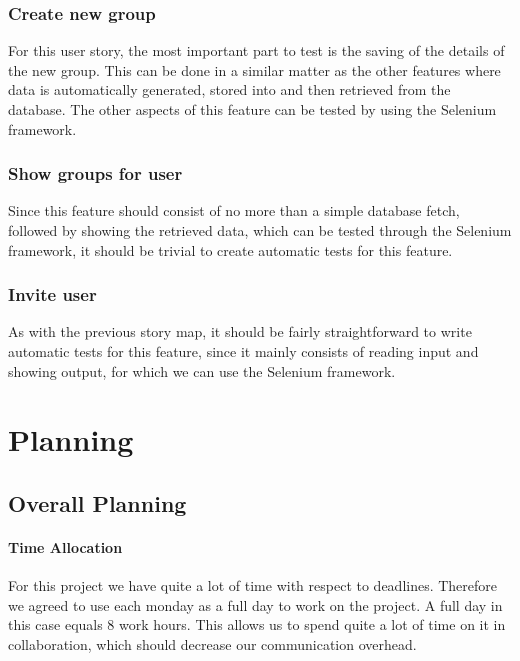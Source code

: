 \documentclass[10pt,a4paper,BCOR12mm, headexclude, footexclude,
  twoside, openright]{scrartcl}
\numberwithin{equation}{section} %
\numberwithin{figure}{section} %
\numberwithin{table}{section} %
\begin{document}
\subsubsection*{Create new group}
For this user story, the most important part to test is the saving of the details
of the new group. This can be done in a similar matter as the other features
where data is automatically generated, stored into and then retrieved from the
database.  The other aspects of this feature can be tested by using the Selenium
framework.

\subsubsection*{Show groups for user}
Since this feature should consist of no more than a simple database fetch,
followed by showing the retrieved data, which can be tested through the Selenium
framework, it should be trivial to create automatic tests for this feature.

\subsubsection*{Invite user}
As with the previous story map, it should be fairly straightforward to write
automatic tests for this feature, since it mainly consists of reading input and
showing output, for which we can use the Selenium framework.


\newpage
\section{Planning}
\subsection{Overall Planning}
\paragraph{Time Allocation}
For this project we have quite a lot of time with respect to
deadlines. Therefore we agreed to use each monday as a full
day to work on the project. A full day in this case equals 8 work hours. This
allows us to spend quite a lot of time on it in collaboration, which should decrease our communication overhead.
\end{document}
